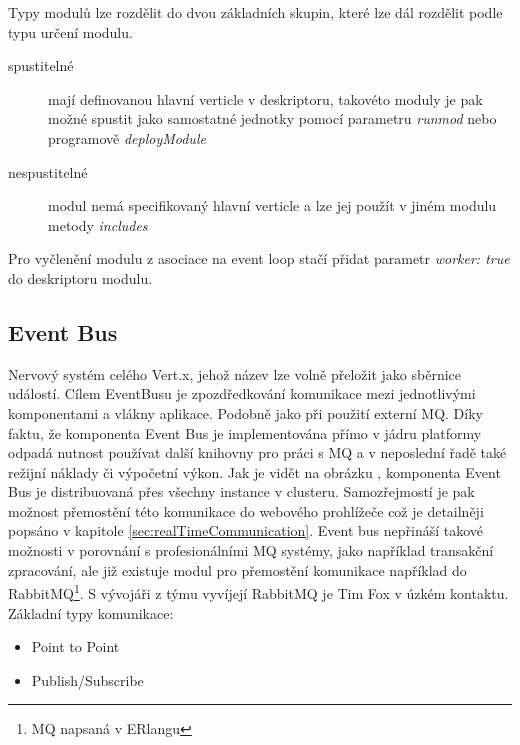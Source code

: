 Typy modulů lze rozdělit do dvou základních skupin, které lze dál rozdělit podle typu určení modulu.

\begin{description}
\item[spustitelné]{mají definovanou hlavní verticle v deskriptoru, takovéto moduly je pak možné spustit jako samostatné jednotky pomocí parametru \emph{runmod} nebo programově \emph{deployModule} }
\item[nespustitelné]{modul nemá specifikovaný hlavní verticle a lze jej použít v jiném modulu  metody \emph{includes}}
\end{description}

Pro vyčlenění modulu z asociace na event loop stačí přidat parametr \emph{worker: true} do deskriptoru modulu.

\subsection{Event Bus}\label{sub:eventBus}

Nervový systém celého Vert.x, jehož název lze volně přeložit jako sběrnice událostí. Cílem EventBusu je zpozdředkování komunikace mezi jednotlivými komponentami a vlákny aplikace. Podobně jako při použití externí MQ. Díky faktu, že komponenta Event Bus je implementována přímo v jádru platformy odpadá nutnost používat další knihovny pro práci s MQ a v neposlední řadě také režijní náklady či výpočetní výkon. Jak je vidět na obrázku , komponenta Event Bus je distribuovaná přes všechny instance v clusteru. Samozřejmostí je pak možnost přemostění této komunikace do webového prohlížeče což je detailněji popsáno v kapitole \ref{sec:realTimeCommunication}. Event bus nepřináší takové možnosti v porovnání s profesionálními MQ systémy, jako například transakční zpracování, ale již existuje modul pro přemostění komunikace například do RabbitMQ\footnote{MQ napsaná v ERlangu}. S vývojáři z týmu vyvíjejí RabbitMQ je Tim Fox v úzkém kontaktu\cite{vertxNodejs}. Základní typy komunikace:
\begin{itemize}
\item{Point to Point}
\item{Publish/Subscribe}
\end{itemize}

